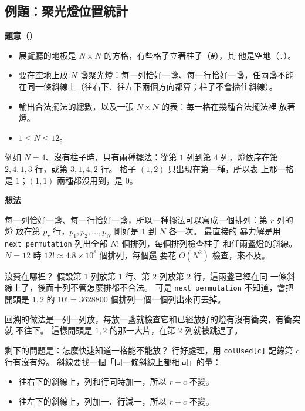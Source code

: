 \subsection{例題：聚光燈位置統計}
\label{sec:ex-spotlight}

\textbf{題意}（）

\begin{itemize}
\item 展覽廳的地板是 $N \times N$ 的方格，有些格子立著柱子（\texttt{\#}），其
他是空地（\texttt{.}）。
\item 要在空地上放 $N$ 盞聚光燈：每一列恰好一盞、每一行恰好一盞，任兩盞不能
在同一條斜線上（往右下、往左下兩個方向都算；柱子不會擋住斜線）。
\item 輸出合法擺法的總數，以及一張 $N \times N$ 的表：每一格在幾種合法擺法裡
放著燈。
\item $1 \le N \le 12$。
\end{itemize}

例如 $N = 4$、沒有柱子時，只有兩種擺法：從第 $1$ 列到第 $4$ 列，燈依序在第
$2, 4, 1, 3$ 行，或第 $3, 1, 4, 2$ 行。 格子 $(1, 2)$ 只出現在第一種，所以表
上那一格是 $1$；$(1, 1)$ 兩種都沒用到，是 $0$。

\textbf{想法}

每一列恰好一盞、每一行恰好一盞，所以一種擺法可以寫成一個排列：第 $r$ 列的燈
放在第 $p_r$ 行，$p_1, p_2, \ldots, p_N$ 剛好是 $1$ 到 $N$ 各一次。 最直接的
暴力解是用 \texttt{next\_permutation} 列出全部 $N!$ 個排列，每個排列檢查柱子
和任兩盞燈的斜線。 $N = 12$ 時 $12! \approx 4.8 \times 10^8$ 個排列，每個還
要花 $O(N^2)$ 檢查，來不及。

浪費在哪裡？ 假設第 $1$ 列放第 $1$ 行、第 $2$ 列放第 $2$ 行，這兩盞已經在同
一條斜線上了，後面十列不管怎麼排都不合法。 可是 \texttt{next\_permutation}
不知道，會把開頭是 $1, 2$ 的 $10! = 3628800$ 個排列一個一個列出來再丟掉。

回溯的做法是一列一列放，每放一盞就檢查它和已經放好的燈有沒有衝突，有衝突就
不往下。 這樣開頭是 $1, 2$ 的那一大片，在第 $2$ 列就被跳過了。

剩下的問題是：怎麼快速知道一格能不能放？ 行好處理，用 \texttt{colUsed[c]}
記錄第 $c$ 行有沒有燈。 斜線要找一個「同一條斜線上都相同」的量：

\begin{itemize}
\item 往右下的斜線上，列和行同時加一，所以 $r - c$ 不變。
\item 往左下的斜線上，列加一、行減一，所以 $r + c$ 不變。
\end{itemize}

